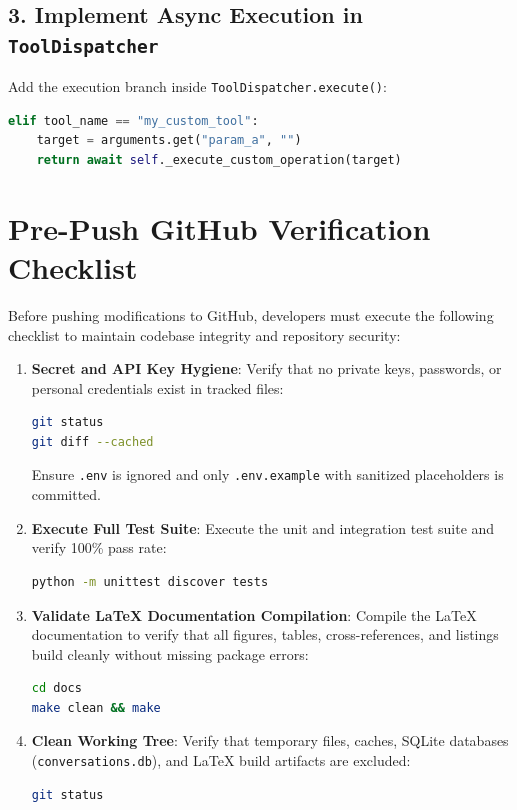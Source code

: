 \subsection{3. Implement Async Execution in \texttt{ToolDispatcher}}
Add the execution branch inside \texttt{ToolDispatcher.execute()}:
\begin{lstlisting}[language=Python]
elif tool_name == "my_custom_tool":
    target = arguments.get("param_a", "")
    return await self._execute_custom_operation(target)
\end{lstlisting}

\section{Pre-Push GitHub Verification Checklist}
Before pushing modifications to GitHub, developers must execute the following checklist to maintain codebase integrity and repository security:

\begin{enumerate}
    \item \textbf{Secret and API Key Hygiene}:
    Verify that no private keys, passwords, or personal credentials exist in tracked files:
    \begin{lstlisting}[language=bash]
git status
git diff --cached
    \end{lstlisting}
    Ensure \texttt{.env} is ignored and only \texttt{.env.example} with sanitized placeholders is committed.
    
    \item \textbf{Execute Full Test Suite}:
    Execute the unit and integration test suite and verify 100\% pass rate:
    \begin{lstlisting}[language=bash]
python -m unittest discover tests
    \end{lstlisting}
    
    \item \textbf{Validate LaTeX Documentation Compilation}:
    Compile the LaTeX documentation to verify that all figures, tables, cross-references, and listings build cleanly without missing package errors:
    \begin{lstlisting}[language=bash]
cd docs
make clean && make
    \end{lstlisting}
    
    \item \textbf{Clean Working Tree}:
    Verify that temporary files, caches, SQLite databases (\texttt{conversations.db}), and LaTeX build artifacts are excluded:
    \begin{lstlisting}[language=bash]
git status
    \end{lstlisting}
\end{enumerate}

